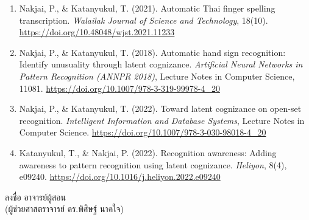{\begin{enumerate}[topsep=0pt,itemsep=0pt,parsep=0pt]
\begin{enumerate}[topsep=0pt,itemsep=0pt,parsep=0pt]
        \item Nakjai, P., \& Katanyukul, T. (2021). Automatic Thai finger spelling transcription.
        \textit{Walailak Journal of Science and Technology}, 18(10).
        \url{https://doi.org/10.48048/wjst.2021.11233}

        \item Nakjai, P., \& Katanyukul, T. (2018). Automatic hand sign recognition: Identify
        unusuality through latent cognizance. \textit{Artificial Neural Networks in Pattern
        Recognition (ANNPR 2018)}, Lecture Notes in Computer Science, 11081.
        \url{https://doi.org/10.1007/978-3-319-99978-4_20}

        \item Nakjai, P., \& Katanyukul, T. (2022). Toward latent cognizance on open-set recognition.
        \textit{Intelligent Information and Database Systems}, Lecture Notes in Computer Science.
        \url{https://doi.org/10.1007/978-3-030-98018-4_20}

        \item Katanyukul, T., \& Nakjai, P. (2022). Recognition awareness: Adding awareness to
        pattern recognition using latent cognizance. \textit{Heliyon}, 8(4), e09240.
        \url{https://doi.org/10.1016/j.heliyon.2022.e09240}
    \end{enumerate}
\end{enumerate}
}

\vspace{3em}
\begin{flushright}
ลงชื่อ \dotfill อาจารย์ผู้สอน\\[2.8em]
       (ผู้ช่วยศาสตราจารย์ ดร.พิศิษฐ์ นาคใจ)
\end{flushright}
